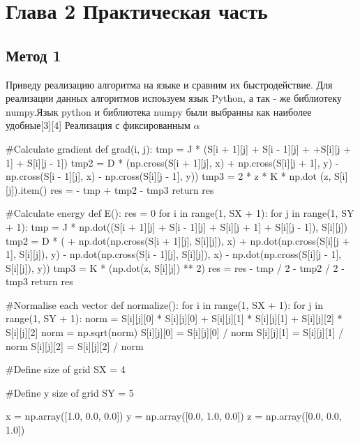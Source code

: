 \documentclass[ 12pt,x11names]{article}
\begin{document}
    \section{
    Глава 2
    Практическая часть}
    \subsection{Метод 1}
    Приведу реализацию алгоритма на языке и сравним их быстродействие.
    Для реализации данных алгоритмов испоьзуем язык Python, а так - же библиотеку numpy.Язык python и библиотека numpy  были выбранны как наиболее удобные[3][4]
    Реализация с фиксированным $\alpha$\\
\begin{python}
    #Calculate gradient
    def grad(i, j):
        tmp = J * (S[i + 1][j] + S[i - 1][j] +
        +S[i][j + 1] + S[i][j - 1])
        tmp2 = D * (np.cross(S[i + 1][j], x)
        + np.cross(S[i][j + 1], y)
        - np.cross(S[i - 1][j], x)
        - np.cross(S[i][j - 1], y))
        tmp3 = 2 * z * K * np.dot  (z, S[i][j]).item()
        res = - tmp + tmp2 - tmp3
        return res

    #Calculate energy
    def E():
        res = 0
        for i in range(1, SX + 1):
            for j in range(1, SY + 1):
                tmp = J * np.dot((S[i + 1][j] + S[i - 1][j] +
                S[i][j + 1] + S[i][j - 1]), S[i][j])
                tmp2 = D * (
                + np.dot(np.cross(S[i + 1][j], S[i][j]), x)
                + np.dot(np.cross(S[i][j + 1], S[i][j]), y)
                - np.dot(np.cross(S[i - 1][j], S[i][j]), x)
                - np.dot(np.cross(S[i][j - 1], S[i][j]), y))
                tmp3 = K * (np.dot(z, S[i][j]) ** 2)
                res = res - tmp / 2 - tmp2 / 2 - tmp3
        return res

    #Normalise each vector
    def normalize():
    for i in range(1, SX + 1):
        for j in range(1, SY + 1):
            norm = S[i][j][0] * S[i][j][0] +
                   S[i][j][1] * S[i][j][1] +
                   S[i][j][2] * S[i][j][2]
            norm = np.sqrt(norm)
            S[i][j][0] = S[i][j][0] / norm
            S[i][j][1] = S[i][j][1] / norm
            S[i][j][2] = S[i][j][2] / norm


    #Define size of grid
    SX = 4

    #Define y size of grid
    SY = 5

    x = np.array([1.0, 0.0, 0.0])
    y = np.array([0.0, 1.0, 0.0])
    z = np.array([0.0, 0.0, 1.0])


\end{python}
\end{document}
